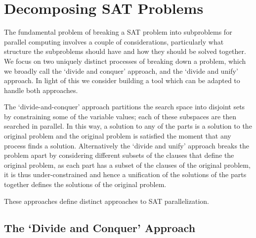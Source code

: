 \documentclass[
10pt, %
a4paper, %
oneside, %
headinclude,footinclude, %
BCOR5mm, %
]{scrartcl}
\begin{document}
\section{Decomposing SAT Problems}

The fundamental problem of breaking a SAT problem into subproblems for parallel computing involves a couple of considerations, particularly what structure the subproblems should have and how they should be solved together.
We focus on two uniquely distinct processes of breaking down a problem, which we broadly call the `divide and conquer' approach, and the `divide and unify' approach.
In light of this we consider building a tool which can be adapted to handle both approaches.

The `divide-and-conquer' approach partitions the search space into disjoint sets by constraining some of the variable values; each of these subspaces are then searched in parallel.
In this way, a solution to any of the parts is a solution to the original problem and the original problem is satisfied the moment that any process finds a solution.
Alternatively the `divide and unify' approach breaks the problem apart by considering different subsets of the clauses that define the original problem, as each part has a subset of the clauses of the original problem, it is thus under-constrained and hence a unification of the solutions of the parts together defines the solutions of the original problem.

These approaches define distinct approaches to SAT parallelization.

\subsection{The `Divide and Conquer' Approach}
\end{document}
